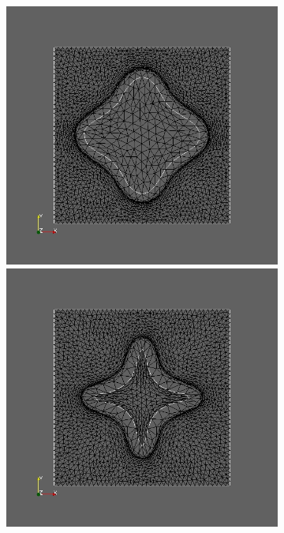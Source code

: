 \documentclass[bibliography=totoc,12pt,a4paper]{scrartcl}
\theoremstyle{exampstyle}
\numberwithin{equation}{section}
\begin{document}
\begin{figure}
\begin{subfigure}{0.3\textwidth}
	\caption{}	
	\end{subfigure}
	\begin{subfigure}{0.3\textwidth}
	\centering
	\includegraphics[scale=0.2]{pic_bigcircle_constlame3.jpg}
	\caption{}	
	\centering
	\includegraphics[scale=0.2]{pic_bigcircle_constlame4.jpg}

\end{subfigure}
\end{figure}
\end{document}
